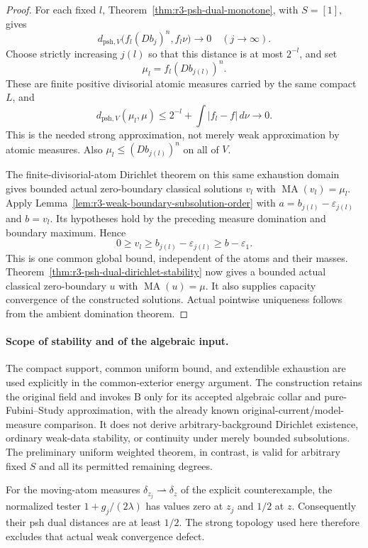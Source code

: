 \documentclass[11pt,a4paper]{article}
\numberwithin{equation}{section}
\theoremstyle{definition}
\theoremstyle{remark}
\begin{document}
\begin{proof}
For each fixed $l$, Theorem~\ref{thm:r3-psh-dual-monotone}, with
$S=[1]$, gives
\[
 d_{\mathrm{psh},V}\bigl(f_l(Db_j)^n,f_l\nu\bigr)
                  \longrightarrow0\quad(j\to\infty).
\]
Choose strictly increasing $j(l)$ so that this distance is at most
$2^{-l}$, and set
\[
 \mu_l=f_l(Db_{j(l)})^n.
\]
These are finite positive divisorial atomic measures carried by
the same compact $L$, and
\[
 d_{\mathrm{psh},V}(\mu_l,\mu)
    \leq2^{-l}+\int|f_l-f|\,d\nu\longrightarrow0.
\]
This is the needed strong approximation, not merely weak
approximation by atomic measures.  Also
$\mu_l\leq(Db_{j(l)})^n$ on all of $V$.

The finite-divisorial-atom Dirichlet theorem on this same
exhaustion domain gives bounded actual zero-boundary classical
solutions $v_l$ with $\operatorname{MA}(v_l)=\mu_l$.
Apply Lemma~\ref{lem:r3-weak-boundary-subsolution-order} with
$a=b_{j(l)}-\varepsilon_{j(l)}$ and $b=v_l$.  Its hypotheses hold
by the preceding measure domination and boundary maximum.  Hence
\[
 0\geq v_l\geq b_{j(l)}-\varepsilon_{j(l)}
              \geq b-\varepsilon_1.
\]
This is one common global bound, independent of the atoms and
their masses.  Theorem~\ref{thm:r3-psh-dual-dirichlet-stability}
now gives a bounded actual classical zero-boundary $u$ with
$\operatorname{MA}(u)=\mu$.  It also supplies capacity convergence
of the constructed solutions.  Actual pointwise uniqueness follows
from the ambient domination theorem.
\end{proof}

\paragraph{Scope of stability and of the algebraic input.}
The compact support, common uniform bound, and extendible exhaustion
are used explicitly in the common-exterior energy argument.  The
construction retains the original field and invokes B only for its
accepted algebraic collar and pure-Fubini--Study approximation, with
the already known original-current/model-measure comparison.  It
does not derive arbitrary-background Dirichlet existence, ordinary
weak-data stability, or continuity under merely bounded subsolutions.
The preliminary uniform weighted theorem, in contrast, is valid for
arbitrary fixed $S$ and all its permitted remaining degrees.

For the moving-atom measures $\delta_{z_j}\rightharpoonup\delta_z$
of the explicit counterexample, the normalized tester
$1+g_j/(2\lambda)$ has values zero at $z_j$ and $1/2$ at $z$.
Consequently their psh dual distances are at least $1/2$.
The strong topology used here therefore excludes that actual weak
convergence defect.
\end{document}
